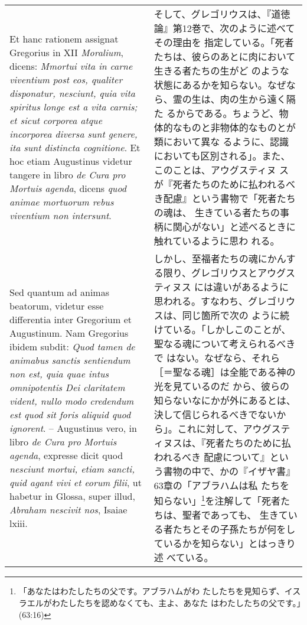 \documentclass[10pt]{jsarticle} %
\begin{document}
\begin{longtable}{p{21em}p{21em}}
\\



Et hanc rationem assignat Gregorius in XII {\it Moralium}, dicens:
{\it Mmortui vita in carne viventium post eos, qualiter disponatur,
nesciunt, quia vita spiritus longe est a vita carnis; et sicut
corporea atque incorporea diversa sunt genere, ita sunt distincta
cognitione}. Et hoc etiam Augustinus videtur tangere in libro {\it de
Cura pro Mortuis agenda}, dicens {\it quod animae mortuorum rebus
viventium non intersunt}.


&


そして、グレゴリウスは、『道徳論』第12巻で、次のように述べてその理由を
指定している。「死者たちは、彼らのあとに肉において生きる者たちの生がど
のような状態にあるかを知らない。なぜなら、霊の生は、肉の生から遠く隔た
るからである。ちょうど、物体的なものと非物体的なものとが類において異な
るように、認識においても区別される」。また、このことは、アウグスティヌ
スが『死者たちのために払われるべき配慮』という書物で「死者たちの魂は、
生きている者たちの事柄に関心がない」と述べるときに触れているように思わ
れる。

\\


Sed quantum ad animas beatorum, videtur esse differentia inter
Gregorium et Augustinum. Nam Gregorius ibidem subdit: {\it Quod tamen
de animabus sanctis sentiendum non est, quia quae intus omnipotentis
Dei claritatem vident, nullo modo credendum est quod sit foris aliquid
quod ignorent}. -- Augustinus vero, in libro {\it de Cura pro Mortuis
agenda}, expresse dicit quod {\it nesciunt mortui, etiam sancti, quid
agant vivi et eorum filii}, ut habetur in Glossa, super illud, {\it
Abraham nescivit nos}, Isaiae {\sc lxiii}.

& しかし、至福者たちの魂にかんする限り、グレゴリウスとアウグスティヌス
には違いがあるように思われる。すなわち、グレゴリウスは、同じ箇所で次の
ように続けている。「しかしこのことが、聖なる魂について考えられるべきで
はない。なぜなら、それら［＝聖なる魂］は全能である神の光を見ているのだ
から、彼らの知らないなにかが外にあるとは、決して信じられるべきでないか
ら」。これに対して、アウグスティヌスは、『死者たちのために払われるべき
配慮について』という書物の中で、かの『イザヤ書』63章の「アブラハムは私
たちを知らない」\footnote{「あなたはわたしたちの父です。アブラハムがわ
たしたちを見知らず、イスラエルがわたしたちを認めなくても、主よ、あなた
はわたしたちの父です。」(63:16)}を注解して「死者たちは、聖者であっても、
生きている者たちとその子孫たちが何をしているかを知らない」とはっきり述
べている。




\end{longtable}
\end{document}
